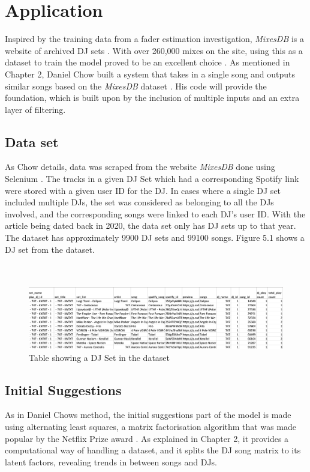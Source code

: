 
\graphicspath{{Chapter5/}}



\chapter{Application}

Inspired by the training data from a fader estimation investigation, \textit{MixesDB} is a website of archived DJ sets \citep{kim_automatic_2017}. With over 260,000 mixes on the site, using this as a dataset to train the model proved to be an excellent choice \citep{mixesdb_main_2023}. As mentioned in Chapter 2, Daniel Chow built a system that takes in a single song and outputs similar songs based on the \textit{MixesDB} dataset \citep{chow_music_2020}. His code will provide the foundation, which is built upon by the inclusion of multiple inputs and an extra layer of filtering.

\section{Data set}
As Chow details, data was scraped from the website \textit{MixesDB} done using Selenium \citep{chow_music_2020}. The tracks in a given DJ Set which had a corresponding Spotify link were stored with a given user ID for the DJ.  In cases where a single DJ set included multiple DJs, the set was considered as belonging to all the DJs involved, and the corresponding songs were linked to each DJ's user ID.  With the article being dated back in 2020, the data set only has DJ sets up to that year. The dataset has approximately 9900 DJ sets and 99100 songs. Figure 5.1 shows a DJ set from the dataset.
\\
\\
\\
\begin{figure}[H]
	\includegraphics[scale=0.45]{images/dataset}
	\centering
	\caption{Table showing a DJ Set in the dataset} 
\end{figure}


\section{Initial Suggestions}
As in Daniel Chows method, the initial suggestions part of the model is made using alternating least squares, a matrix factorisation algorithm that was made popular by the Netflix Prize award \citep{zhou_large-scale_2008}. As explained in Chapter 2, it provides a computational way of handling a dataset, and it splits the DJ song matrix to its latent factors, revealing trends in between songs and DJs.

